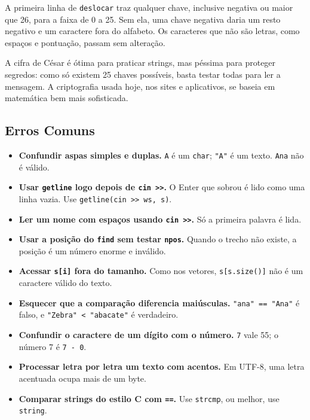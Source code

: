 A primeira linha de \texttt{deslocar} traz qualquer chave, inclusive negativa ou maior que 26, para a faixa de 0 a 25. Sem ela, uma chave negativa daria um resto negativo e um caractere fora do alfabeto. Os caracteres que não são letras, como espaços e pontuação, passam sem alteração.

A cifra de César é ótima para praticar strings, mas péssima para proteger segredos: como só existem 25 chaves possíveis, basta testar todas para ler a mensagem. A criptografia usada hoje, nos sites e aplicativos, se baseia em matemática bem mais sofisticada.

\subsection{Erros Comuns}

\begin{itemize}
  \item \textbf{Confundir aspas simples e duplas.} \texttt{\textquotesingle{}A\textquotesingle{}} é um \texttt{char}; \texttt{"A"} é um texto. \texttt{\textquotesingle{}Ana\textquotesingle{}} não é válido.
  \item \textbf{Usar \texttt{getline} logo depois de \texttt{cin >>}.} O Enter que sobrou é lido como uma linha vazia. Use \texttt{getline(cin >> ws, s)}.
  \item \textbf{Ler um nome com espaços usando \texttt{cin >>}.} Só a primeira palavra é lida.
  \item \textbf{Usar a posição do \texttt{find} sem testar \texttt{npos}.} Quando o trecho não existe, a posição é um número enorme e inválido.
  \item \textbf{Acessar \texttt{s[i]} fora do tamanho.} Como nos vetores, \texttt{s[s.size()]} não é um caractere válido do texto.
  \item \textbf{Esquecer que a comparação diferencia maiúsculas.} \texttt{"ana" == "Ana"} é falso, e \texttt{"Zebra" < "abacate"} é verdadeiro.
  \item \textbf{Confundir o caractere de um dígito com o número.} \texttt{\textquotesingle{}7\textquotesingle{}} vale 55; o número 7 é \texttt{\textquotesingle{}7\textquotesingle{} - \textquotesingle{}0\textquotesingle{}}.
  \item \textbf{Processar letra por letra um texto com acentos.} Em UTF-8, uma letra acentuada ocupa mais de um byte.
  \item \textbf{Comparar strings do estilo C com \texttt{==}.} Use \texttt{strcmp}, ou melhor, use \texttt{string}.
\end{itemize}
